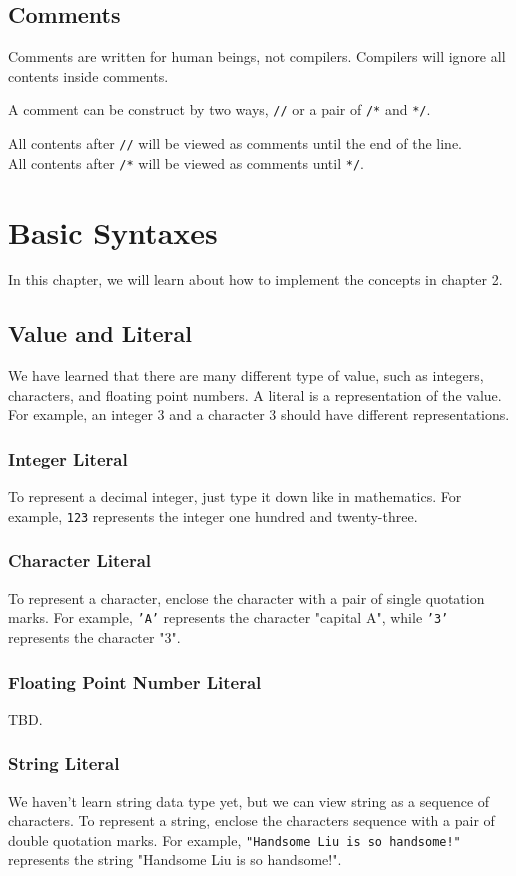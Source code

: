 \documentclass{report}
\begin{document}
\section{Comments}
Comments are written for human beings, not compilers. Compilers will ignore all contents inside comments.

A comment can be construct by two ways, \texttt{//} or a pair of \texttt{/*}  and \texttt{*/}.

All contents after \texttt{//} will be viewed as comments until the end of the line.\\
All contents after \texttt{/*} will be viewed as comments until \texttt{*/}.\\

\chapter{Basic Syntaxes}
In this chapter, we will learn about how to implement the concepts in chapter 2.

\section{Value and Literal}
    We have learned that there are many different type of value, such as integers, characters, and floating point numbers. A literal is a representation of the value. For example, an integer 3 and a character 3 should have different representations.
    \subsection{Integer Literal}
        To represent a decimal integer, just type it down like in mathematics. For example, \texttt{123} represents the integer one hundred and twenty-three.

    \subsection{Character Literal}
        To represent a character, enclose the character with a pair of single quotation marks. For example, \texttt{'A'} represents the character "capital A", while \texttt{'3'} represents the character "3".

    \subsection{Floating Point Number Literal}
        TBD.
    \subsection{String Literal}
        We haven't learn string data type yet, but we can view string as a sequence of characters. To represent a string, enclose the characters sequence with a pair of double quotation marks. For example, \texttt{"Handsome Liu is so handsome!"} represents the string "Handsome Liu is so handsome!".
\end{document}
